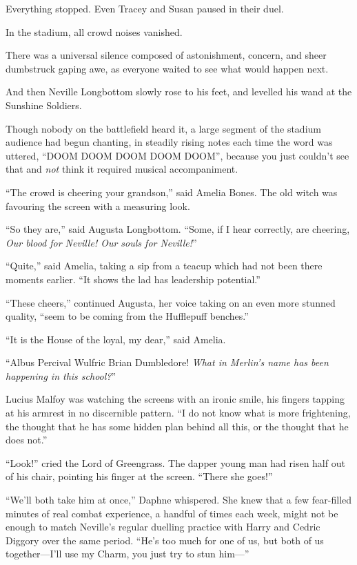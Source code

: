 Everything stopped. Even Tracey and Susan paused in their duel.

In the stadium, all crowd noises vanished.

There was a universal silence composed of astonishment, concern, and sheer dumbstruck gaping awe, as everyone waited to see what would happen next.

And then Neville Longbottom slowly rose to his feet, and levelled his wand at the Sunshine Soldiers.

Though nobody on the battlefield heard it, a large segment of the stadium audience had begun chanting, in steadily rising notes each time the word was uttered, “DOOM DOOM DOOM DOOM DOOM”, because you just couldn’t see that and \emph{not} think it required musical accompaniment.

“The crowd is cheering your grandson,” said Amelia Bones. The old witch was favouring the screen with a measuring look.

“So they are,” said Augusta Longbottom. “Some, if I hear correctly, are cheering, \emph{Our blood for Neville! Our souls for Neville!}”

“Quite,” said Amelia, taking a sip from a teacup which had not been there moments earlier. “It shows the lad has leadership potential.”

“These cheers,” continued Augusta, her voice taking on an even more stunned quality, “seem to be coming from the Hufflepuff benches.”

“It is the House of the loyal, my dear,” said Amelia.

“Albus Percival Wulfric Brian Dumbledore! \emph{What in Merlin’s name has been happening in this school?}”

Lucius Malfoy was watching the screens with an ironic smile, his fingers tapping at his armrest in no discernible pattern. “I do not know what is more frightening, the thought that he has some hidden plan behind all this, or the thought that he does not.”

“Look!” cried the Lord of Greengrass. The dapper young man had risen half out of his chair, pointing his finger at the screen. “There she goes!”

\later

“We’ll both take him at once,” Daphne whispered. She knew that a few fear-filled minutes of real combat experience, a handful of times each week, might not be enough to match Neville’s regular duelling practice with Harry and Cedric Diggory over the same period. “He’s too much for one of us, but both of us together—I’ll use my Charm, you just try to stun him—”


